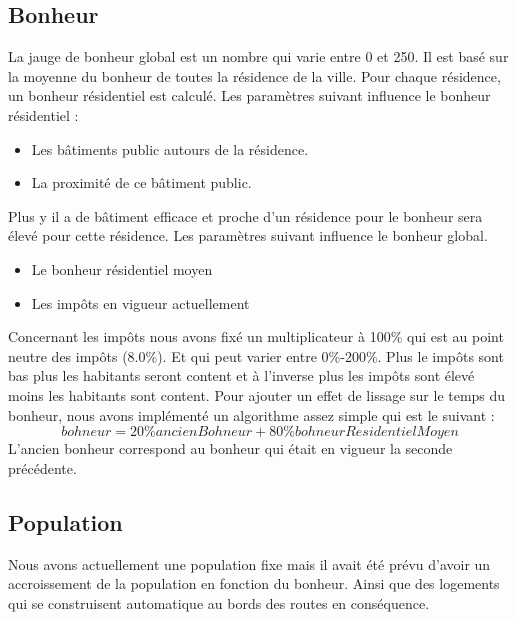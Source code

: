 \documentclass[a4paper,10pt,openany,oneside]{book}
\begin{document}
\subsection{Bonheur}
La jauge de bonheur global est un nombre qui varie entre 0 et 250. Il est basé sur la moyenne du bonheur de toutes la résidence de la ville. 
\newline
Pour chaque résidence, un bonheur résidentiel est calculé.
Les paramètres suivant influence le bonheur résidentiel :
\begin{itemize}
	\item Les bâtiments public autours de la résidence.
	\item La proximité de ce bâtiment public.
\end{itemize}
Plus y il a de bâtiment efficace et proche d'un résidence pour le bonheur sera élevé pour cette résidence.
Les paramètres suivant influence le bonheur global.
\begin{itemize}
	\item Le bonheur résidentiel moyen
	\item Les impôts en vigueur actuellement
\end{itemize}
Concernant les impôts nous avons fixé un multiplicateur à 100\% qui est au point neutre des impôts (8.0\%). Et qui peut varier entre 0\%-200\%. Plus le impôts sont bas plus les habitants seront content et à l'inverse plus les impôts sont élevé moins les habitants sont content.
\newline
Pour ajouter un effet de lissage sur le temps du bonheur, nous avons implémenté un algorithme assez simple qui est le suivant :
\[bohneur = 20\% ancienBohneur + 80\% bohneurResidentielMoyen\]
L'ancien bonheur correspond au bonheur qui était en vigueur la seconde précédente.

\subsection{Population}
Nous avons actuellement une population fixe mais il avait été prévu d'avoir un accroissement de la population en fonction du bonheur. Ainsi que des logements qui se construisent automatique au bords des routes en conséquence.
\end{document}
